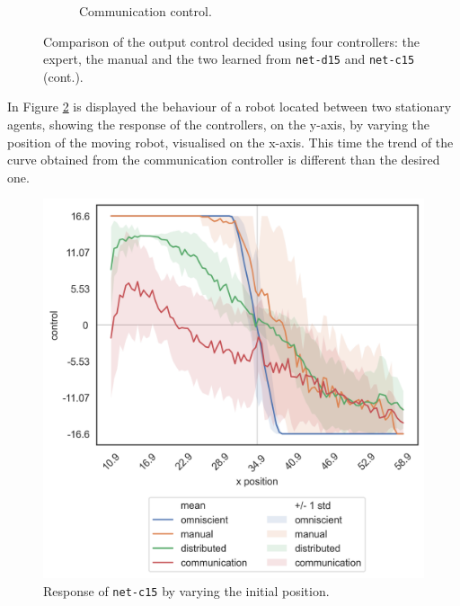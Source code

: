 \begin{figure}[!htb]
\begin{center}
\begin{subfigure}[h]{0.35\textwidth}
			\caption{Communication control.}
		\end{subfigure}
	\end{center}
	\vspace{-0.5cm}
	\caption[]{Comparison of the output control decided using four controllers: the 
	expert, the manual and the two learned from \texttt{net-d15} and 
	\texttt{net-c15} (cont.).}
	\label{fig:net-c15control}
\end{figure}

In Figure \ref{fig:net-c15responseposition} is displayed the behaviour of a robot 
located between two stationary agents, showing the response of the controllers, 
on the y-axis, by varying the position of the moving robot, visualised on the 
x-axis.  This time the trend of the curve obtained from the communication 
controller is 
different than the desired one.
\begin{figure}[!htb]
	\centering
	\includegraphics[width=.45\textwidth]{contents/images/net-c15/response-varying_init_position-communication}%
	\caption{Response of \texttt{net-c15} by varying the initial position.}
	\label{fig:net-c15responseposition}
\end{figure}


